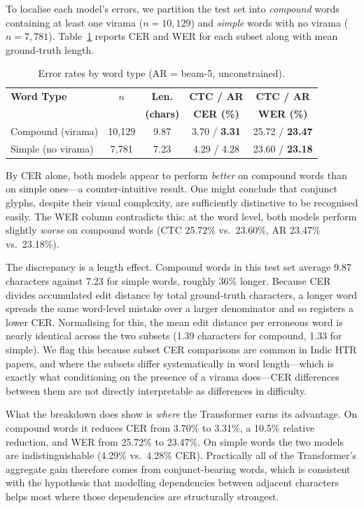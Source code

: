 \documentclass[pdflatex,sn-mathphys-num]{sn-jnl}
\begin{document}
To localise each model's errors, we partition the test set into \textit{compound} words containing at least one virama ($n = 10{,}129$) and \textit{simple} words with no virama ($n = 7{,}781$). Table~\ref{tab:compound} reports CER and WER for each subset along with mean ground-truth length.

\begin{table}[t]
\centering
\caption{Error rates by word type (AR = beam-5, unconstrained).}
\label{tab:compound}
\begin{tabular}{lcccc}
\toprule
\textbf{Word Type} & \textbf{$n$} & \textbf{Len.} & \textbf{CTC / AR} & \textbf{CTC / AR} \\
 & & \textbf{(chars)} & \textbf{CER (\%)} & \textbf{WER (\%)} \\
\midrule
Compound (virama) & 10,129 & 9.87 & 3.70 / \textbf{3.31} & 25.72 / \textbf{23.47} \\
Simple (no virama) & 7,781 & 7.23 & 4.29 / 4.28 & 23.60 / \textbf{23.18} \\
\bottomrule
\end{tabular}
\end{table}

By CER alone, both models appear to perform \textit{better} on compound words than on simple ones---a counter-intuitive result. One might conclude that conjunct glyphs, despite their visual complexity, are sufficiently distinctive to be recognised easily. The WER column contradicts this: at the word level, both models perform slightly \textit{worse} on compound words (CTC 25.72\% vs.\ 23.60\%, AR 23.47\% vs.\ 23.18\%).

The discrepancy is a length effect. Compound words in this test set average 9.87 characters against 7.23 for simple words, roughly 36\% longer. Because CER divides accumulated edit distance by total ground-truth characters, a longer word spreads the same word-level mistake over a larger denominator and so registers a lower CER. Normalising for this, the mean edit distance per erroneous word is nearly identical across the two subsets (1.39 characters for compound, 1.33 for simple). We flag this because subset CER comparisons are common in Indic HTR papers, and where the subsets differ systematically in word length---which is exactly what conditioning on the presence of a virama does---CER differences between them are not directly interpretable as differences in difficulty.

What the breakdown does show is \textit{where} the Transformer earns its advantage. On compound words it reduces CER from 3.70\% to 3.31\%, a 10.5\% relative reduction, and WER from 25.72\% to 23.47\%. On simple words the two models are indistinguishable (4.29\% vs.\ 4.28\% CER). Practically all of the Transformer's aggregate gain therefore comes from conjunct-bearing words, which is consistent with the hypothesis that modelling dependencies between adjacent characters helps most where those dependencies are structurally strongest.
\end{document}
